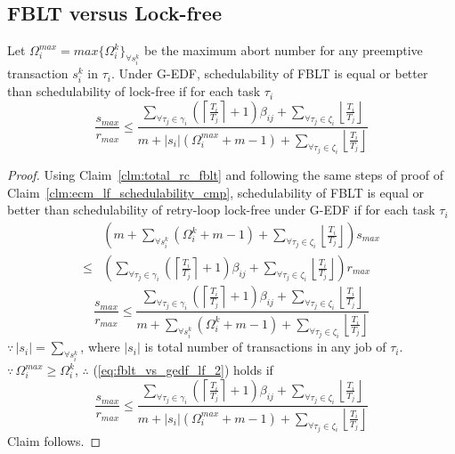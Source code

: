 \subsection{FBLT versus Lock-free}\label{sec:fblt vs lock free}
%
\begin{clm}\label{clm:fblt_edf_lock-free}
Let $\Omega_i^{max}=max\{\Omega_i^k\}_{\forall s_i^k}$ be the maximum abort number for any preemptive transaction $s_i^k$ in $\tau_i$. Under G-EDF, schedulability of FBLT is equal or better than schedulability of lock-free if for each task $\tau_i$ 
%
\begin{equation*}
\frac{s_{max}}{r_{max}}\le\frac{\sum_{\forall\tau_{j}\in\gamma_{i}}\left(\left\lceil \frac{T_{i}}{T_{j}}\right\rceil +1\right)\beta_{ij}+\sum_{\forall\tau_{j}\in\zeta_{i}}\left\lfloor \frac{T_{i}}{T_{j}}\right\rfloor }{m+|s_{i}|\left(\Omega_{i}^{max}+m-1\right)+\sum_{\forall\tau_{j}\in\zeta_{i}}\left\lfloor \frac{T_{i}}{T_{j}}\right\rfloor }
\label{eq:fblt_vs_gedf_lf_3}
\end{equation*}
%
\end{clm}
%
\begin{proof}
%
Using Claim~\ref{clm:total_rc_fblt} and following the same steps of proof of Claim~\ref{clm:ecm_lf_schedulability_cmp}, schedulability of FBLT is equal or better than schedulability of retry-loop lock-free under G-EDF if for each task $\tau_i$
%
\begin{eqnarray}
 & \left(m+\sum_{\forall s_{i}^{k}}\left(\Omega_{i}^{k}+m-1\right)+\sum_{\forall\tau_{j}\in\zeta_{i}}\left\lfloor \frac{T_{i}}{T_{j}}\right\rfloor \right)s_{max}\nonumber \\
\le & \left(\sum_{\forall\tau_{j}\in\gamma_{i}}\left(\left\lceil \frac{T_{i}}{T_{j}}\right\rceil +1\right)\beta_{ij}+\sum_{\forall\tau_{j}\in\zeta_{i}}\left\lfloor \frac{T_{i}}{T_{j}}\right\rfloor \right)r_{max}\label{eq:fblt_vs_gedf_lf_1}
\end{eqnarray}
%
\begin{equation}
\frac{s_{max}}{r_{max}}\le\frac{\sum_{\forall\tau_{j}\in\gamma_{i}}\left(\left\lceil \frac{T_{i}}{T_{j}}\right\rceil +1\right)\beta_{ij}+\sum_{\forall\tau_{j}\in\zeta_{i}}\left\lfloor \frac{T_{i}}{T_{j}}\right\rfloor }{m+\sum_{\forall s_{i}^{k}}\left(\Omega_{i}^{k}+m-1\right)+\sum_{\forall\tau_{j}\in\zeta_{i}}\left\lfloor \frac{T_{i}}{T_{j}}\right\rfloor }\label{eq:fblt_vs_gedf_lf_2}
\end{equation}
%
$\because\,|s_{i}|=\sum_{\forall s_{i}^{k}}$, where $|s_{i}|$ is
total number of transactions in any job of $\tau_{i}$. $\because\,\Omega_{i}^{max}\ge\Omega_{i}^{k}$,
$\therefore$ (\ref{eq:fblt_vs_gedf_lf_2}) holds if 
%
\begin{equation}
\frac{s_{max}}{r_{max}}\le\frac{\sum_{\forall\tau_{j}\in\gamma_{i}}\left(\left\lceil \frac{T_{i}}{T_{j}}\right\rceil +1\right)\beta_{ij}+\sum_{\forall\tau_{j}\in\zeta_{i}}\left\lfloor \frac{T_{i}}{T_{j}}\right\rfloor }{m+|s_{i}|\left(\Omega_{i}^{max}+m-1\right)+\sum_{\forall\tau_{j}\in\zeta_{i}}\left\lfloor \frac{T_{i}}{T_{j}}\right\rfloor }
\label{eq:fblt_vs_gedf_lf_3}
\end{equation}
%
Claim follows.
%
\end{proof}
